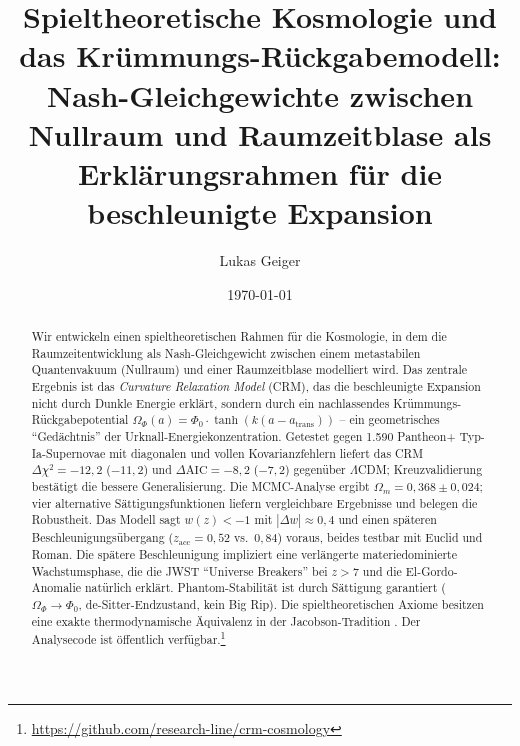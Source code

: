 \documentclass[aps,prd,twocolumn,superscriptaddress,nofootinbib]{revtex4-2}
\begin{document}

\title{Spieltheoretische Kosmologie und das Kr\"ummungs-R\"uckgabemodell: Nash-Gleichgewichte zwischen Nullraum und Raumzeitblase als Erkl\"arungsrahmen f\"ur die beschleunigte Expansion}

\author{Lukas Geiger}

\date{\today}


\begin{abstract}
Wir entwickeln einen spieltheoretischen Rahmen f\"ur die Kosmologie, in dem die Raumzeitentwicklung als Nash-Gleichgewicht zwischen einem metastabilen Quantenvakuum (Nullraum) und einer Raumzeitblase modelliert wird. Das zentrale Ergebnis ist das \textit{Curvature Relaxation Model} (CRM), das die beschleunigte Expansion nicht durch Dunkle Energie erkl\"art, sondern durch ein nachlassendes Kr\"ummungs-R\"uckgabepotential $\Omega_\Phi(a) = \Phi_0 \cdot \tanh(k(a - a_{\mathrm{trans}}))$ -- ein geometrisches ``Ged\"achtnis'' der Urknall-Energiekonzentration. Getestet gegen 1.590 Pantheon+ Typ-Ia-Supernovae \cite{Scolnic2022} mit diagonalen und vollen Kovarianzfehlern liefert das CRM $\Delta\chi^2 = -12{,}2$ ($-11{,}2$) und $\Delta\mathrm{AIC} = -8{,}2$ ($-7{,}2$) gegen\"uber $\Lambda$CDM; Kreuzvalidierung best\"atigt die bessere Generalisierung. Die MCMC-Analyse ergibt $\Omega_m = 0{,}368 \pm 0{,}024$; vier alternative S\"attigungsfunktionen liefern vergleichbare Ergebnisse und belegen die Robustheit. Das Modell sagt $w(z) < -1$ mit $|\Delta w| \approx 0{,}4$ und einen sp\"ateren Beschleunigungs\"ubergang ($z_{\mathrm{acc}} = 0{,}52$ vs.\ $0{,}84$) voraus, beides testbar mit Euclid und Roman. Die sp\"atere Beschleunigung impliziert eine verl\"angerte materiedominierte Wachstumsphase, die die JWST ``Universe Breakers'' bei $z > 7$ \cite{Labbe2023} und die El-Gordo-Anomalie \cite{Asencio2023} nat\"urlich erkl\"art. Phantom-Stabilit\"at ist durch S\"attigung garantiert ($\Omega_\Phi \to \Phi_0$, de-Sitter-Endzustand, kein Big Rip). Die spieltheoretischen Axiome besitzen eine exakte thermodynamische \"Aquivalenz in der Jacobson-Tradition \cite{Jacobson1995}. Der Analysecode ist \"offentlich verf\"ugbar.\footnote{\url{https://github.com/research-line/crm-cosmology}}

\end{abstract}
\end{document}
